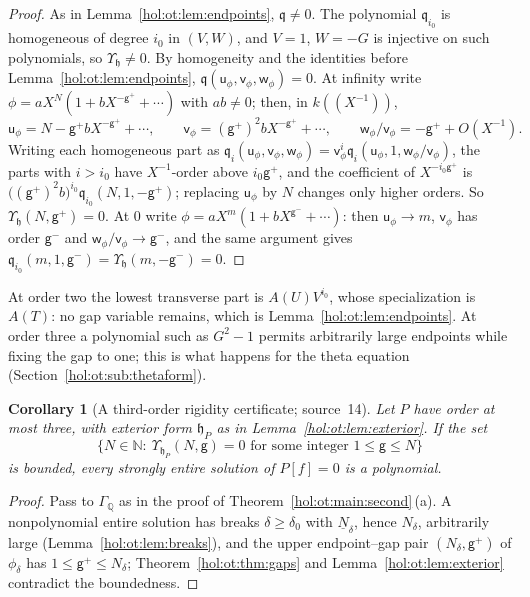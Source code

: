 \documentclass[11pt]{article}
\numberwithin{equation}{section}
\newtheorem{corollary}[theorem]{Corollary}
\theoremstyle{definition}
\theoremstyle{remark}
\newcommand{\Q}{\mathbb Q}
\newcommand{\N}{\mathbb N}
\begin{document}
\begin{proof}
As in Lemma~\ref{hol:ot:lem:endpoints}, $\mathfrak q\ne0$. The polynomial
$\mathfrak q_{i_0}$ is homogeneous of degree $i_0$ in $(V,W)$, and $V=1$,
$W=-G$ is injective on such polynomials, so $\Upsilon_{\mathfrak h}\ne0$. By
homogeneity and the identities before Lemma~\ref{hol:ot:lem:endpoints},
$\mathfrak q(\mathsf u_\phi,\mathsf v_\phi,\mathsf w_\phi)=0$. At infinity
write $\phi=aX^N(1+bX^{-\mathsf g^+}+\cdots)$ with $ab\ne0$; then, in
$k((X^{-1}))$,
\[
 \mathsf u_\phi=N-\mathsf g^+bX^{-\mathsf g^+}+\cdots,\qquad
 \mathsf v_\phi=(\mathsf g^+)^2bX^{-\mathsf g^+}+\cdots,\qquad
 \mathsf w_\phi/\mathsf v_\phi=-\mathsf g^++O(X^{-1}).
\]
Writing each homogeneous part as
$\mathfrak q_i(\mathsf u_\phi,\mathsf v_\phi,\mathsf w_\phi)=\mathsf v_\phi^i
\mathfrak q_i(\mathsf u_\phi,1,\mathsf w_\phi/\mathsf v_\phi)$, the parts with
$i>i_0$ have $X^{-1}$-order above $i_0\mathsf g^+$, and the coefficient of
$X^{-i_0\mathsf g^+}$ is $\bigl((\mathsf g^+)^2b\bigr)^{i_0}
\mathfrak q_{i_0}(N,1,-\mathsf g^+)$; replacing $\mathsf u_\phi$ by $N$ changes
only higher orders. So $\Upsilon_{\mathfrak h}(N,\mathsf g^+)=0$. At $0$
write $\phi=aX^m(1+bX^{\mathsf g^-}+\cdots)$: then $\mathsf u_\phi\to m$,
$\mathsf v_\phi$ has order $\mathsf g^-$ and
$\mathsf w_\phi/\mathsf v_\phi\to\mathsf g^-$, and the same argument gives
$\mathfrak q_{i_0}(m,1,\mathsf g^-)=\Upsilon_{\mathfrak h}(m,-\mathsf g^-)=0$.
\end{proof}

At order two the lowest transverse part is $A(U)V^{i_0}$, whose
specialization is $A(T)$: no gap variable remains, which is
Lemma~\ref{hol:ot:lem:endpoints}. At order three a polynomial such as $G^2-1$
permits arbitrarily large endpoints while fixing the gap to one; this is what
happens for the theta equation (Section~\ref{hol:ot:sub:thetaform}).

\begin{corollary}[A third-order rigidity certificate; source~14]
\label{hol:ot:cor:gapcriterion}
Let $P$ have order at most three, with exterior form $\mathfrak h_P$ as in
Lemma~\ref{hol:ot:lem:exterior}. If the set
\[
 \{N\in\N:\ \Upsilon_{\mathfrak h_P}(N,\mathsf g)=0\text{ for some integer }
 1\le\mathsf g\le N\}
\]
is bounded, every strongly entire solution of $P[f]=0$ is a polynomial.
\end{corollary}

\begin{proof}
Pass to $\Gamma_\Q$ as in the proof of Theorem~\ref{hol:ot:main:second}\,(a).
A nonpolynomial entire solution has breaks $\delta\ge\delta_0$ with
$\underline N_\delta$, hence $N_\delta$, arbitrarily large
(Lemma~\ref{hol:ot:lem:breaks}), and the upper endpoint--gap pair
$(N_\delta,\mathsf g^+)$ of $\phi_\delta$ has $1\le\mathsf g^+\le N_\delta$;
Theorem~\ref{hol:ot:thm:gaps} and Lemma~\ref{hol:ot:lem:exterior} contradict the
boundedness.
\end{proof}
\end{document}
